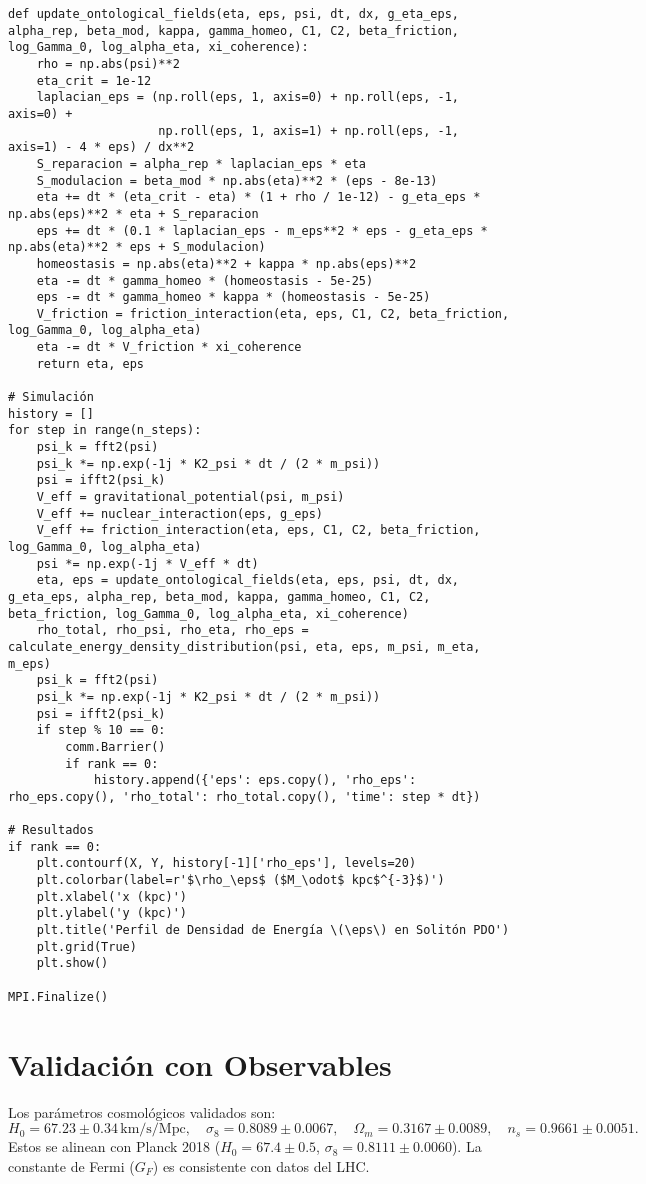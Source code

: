 \documentclass[a4paper,12pt]{article}
\newcommand{\eps}{\varepsilon}
\begin{document}
\begin{verbatim}
def update_ontological_fields(eta, eps, psi, dt, dx, g_eta_eps, alpha_rep, beta_mod, kappa, gamma_homeo, C1, C2, beta_friction, log_Gamma_0, log_alpha_eta, xi_coherence):
    rho = np.abs(psi)**2
    eta_crit = 1e-12
    laplacian_eps = (np.roll(eps, 1, axis=0) + np.roll(eps, -1, axis=0) +
                     np.roll(eps, 1, axis=1) + np.roll(eps, -1, axis=1) - 4 * eps) / dx**2
    S_reparacion = alpha_rep * laplacian_eps * eta
    S_modulacion = beta_mod * np.abs(eta)**2 * (eps - 8e-13)
    eta += dt * (eta_crit - eta) * (1 + rho / 1e-12) - g_eta_eps * np.abs(eps)**2 * eta + S_reparacion
    eps += dt * (0.1 * laplacian_eps - m_eps**2 * eps - g_eta_eps * np.abs(eta)**2 * eps + S_modulacion)
    homeostasis = np.abs(eta)**2 + kappa * np.abs(eps)**2
    eta -= dt * gamma_homeo * (homeostasis - 5e-25)
    eps -= dt * gamma_homeo * kappa * (homeostasis - 5e-25)
    V_friction = friction_interaction(eta, eps, C1, C2, beta_friction, log_Gamma_0, log_alpha_eta)
    eta -= dt * V_friction * xi_coherence
    return eta, eps

# Simulación
history = []
for step in range(n_steps):
    psi_k = fft2(psi)
    psi_k *= np.exp(-1j * K2_psi * dt / (2 * m_psi))
    psi = ifft2(psi_k)
    V_eff = gravitational_potential(psi, m_psi)
    V_eff += nuclear_interaction(eps, g_eps)
    V_eff += friction_interaction(eta, eps, C1, C2, beta_friction, log_Gamma_0, log_alpha_eta)
    psi *= np.exp(-1j * V_eff * dt)
    eta, eps = update_ontological_fields(eta, eps, psi, dt, dx, g_eta_eps, alpha_rep, beta_mod, kappa, gamma_homeo, C1, C2, beta_friction, log_Gamma_0, log_alpha_eta, xi_coherence)
    rho_total, rho_psi, rho_eta, rho_eps = calculate_energy_density_distribution(psi, eta, eps, m_psi, m_eta, m_eps)
    psi_k = fft2(psi)
    psi_k *= np.exp(-1j * K2_psi * dt / (2 * m_psi))
    psi = ifft2(psi_k)
    if step % 10 == 0:
        comm.Barrier()
        if rank == 0:
            history.append({'eps': eps.copy(), 'rho_eps': rho_eps.copy(), 'rho_total': rho_total.copy(), 'time': step * dt})

# Resultados
if rank == 0:
    plt.contourf(X, Y, history[-1]['rho_eps'], levels=20)
    plt.colorbar(label=r'$\rho_\eps$ ($M_\odot$ kpc$^{-3}$)')
    plt.xlabel('x (kpc)')
    plt.ylabel('y (kpc)')
    plt.title('Perfil de Densidad de Energía \(\eps\) en Solitón PDO')
    plt.grid(True)
    plt.show()

MPI.Finalize()
\end{verbatim}

\section{Validación con Observables}
Los parámetros cosmológicos validados son:
\[
H_0 = 67.23 \pm 0.34 \, \text{km/s/Mpc}, \quad \sigma_8 = 0.8089 \pm 0.0067, \quad \Omega_m = 0.3167 \pm 0.0089, \quad n_s = 0.9661 \pm 0.0051.
\]
Estos se alinean con Planck 2018 (\(H_0 = 67.4 \pm 0.5\), \(\sigma_8 = 0.8111 \pm 0.0060\)). La constante de Fermi (\(G_F\)) es consistente con datos del LHC.
\end{document}
